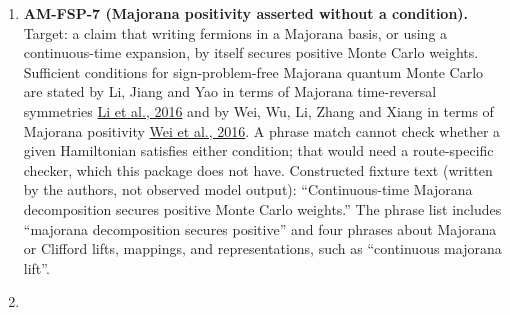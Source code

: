 \documentclass[
  11pt,
]{article}
\begin{document}
\begin{enumerate}
  The diagonal sign-gauge question is separate again. Non-bipartiteness
  alone does not obstruct a diagonal sign gauge. For example, the
  \(3 \times 3\) Hamiltonian
  \[H = \begin{pmatrix}0 & 1 & -1 \\ 1 & 0 & 1 \\ -1 & 1 & 0\end{pmatrix}\]
  has a triangle as its underlying graph, yet the diagonal sign gauge
  \(S = \operatorname{diag}(1, -1, 1)\) makes every off-diagonal entry
  non-positive:
  \[SHS = \begin{pmatrix}0 & -1 & -1 \\ -1 & 0 & -1 \\ -1 & -1 & 0\end{pmatrix}.\]
  For a finite real symmetric matrix, a diagonal sign gauge exists
  exactly when every cycle of its nonzero off-diagonal graph has product
  \(+1\) for \(\operatorname{sgn}(-H_{ij})\). Necessity follows by
  multiplying the vertex-sign constraints around a cycle. For
  sufficiency, assign vertex signs along a spanning tree; the cycle
  products make every remaining edge consistent. Thus obstruction
  requires a frustrated signed cycle, one whose gauge-invariant sign
  product \(\prod_{(i,j) \in C} \operatorname{sgn}(-H_{ij})\) equals
  \(-1\), rather than odd-cycle topology alone.
\item
  \textbf{AM-FSP-7 (Majorana positivity asserted without a condition).}
  Target: a claim that writing fermions in a Majorana basis, or using a
  continuous-time expansion, by itself secures positive Monte Carlo
  weights. Sufficient conditions for sign-problem-free Majorana quantum
  Monte Carlo are stated by Li, Jiang and Yao in terms of Majorana
  time-reversal symmetries
  \href{https://doi.org/10.1103/PhysRevLett.117.267002}{Li et al., 2016}
  and by Wei, Wu, Li, Zhang and Xiang in terms of Majorana positivity
  \href{https://doi.org/10.1103/PhysRevLett.116.250601}{Wei et al.,
  2016}. A phrase match cannot check whether a given Hamiltonian
  satisfies either condition; that would need a route-specific checker,
  which this package does not have. Constructed fixture text (written by
  the authors, not observed model output): ``Continuous-time Majorana
  decomposition secures positive Monte Carlo weights.'' The phrase list
  includes ``majorana decomposition secures positive'' and four phrases
  about Majorana or Clifford lifts, mappings, and representations, such
  as ``continuous majorana lift''.
\item

\end{enumerate}
\end{document}
